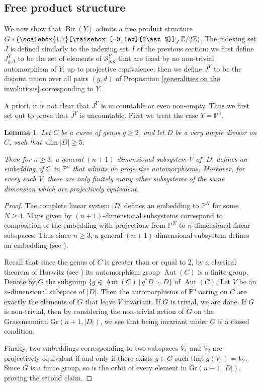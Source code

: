 \documentclass[JEP,XML,SOM,Unicode,published]{cedram}
\theoremstyle{plain}
\newtheorem{lemma}[theorem]{Lemma}
\theoremstyle{definition}
\newcommand\Aut{\operatorname{Aut}}
\newcommand\Bir{\operatorname{Bir}}
\newcommand{\ZZ}{\mathbb{Z}}
\newcommand{\PP}{\mathbb{P}}
\newcommand{\freeprod}{\mathop{\scalebox{1.7}{\raisebox{-0.1ex}{$\ast$}}}}
\begin{document}
\subsection{Free product structure}

We now show that $\Bir(Y)$ admits a free product structure $G \ast \left(\freeprod_J \ZZ/2\ZZ\right)$.
The indexing set $J$ is defined similarly to the indexing set~$I$ of the previous section: we first define $J_{g,d}^Y$ to be the set of elements of $\mathcal{S}_{g,d}^Y$ that are fixed by no non-trivial automorphism of $Y$, up to projective equivalence; then we define $J^Y$ to be the disjoint union over all pairs $(g,d)$ of Proposition \ref{generalities on the involutions} corresponding to $Y$.

A priori, it is not clear that $J^Y$ is uncountable or even non-empty. Thus we first set out to prove that $J^Y$ is uncountable. First we treat the case $Y = \PP^3$.

\begin{lemma}\label{non complete implies no autos}
Let $C$ be a curve of genus $g \geq 2$, and let $D$ be a very ample divisor on $C$, such that $\dim \lvert D \rvert \geq 5$.

Then for $n \geq 3$, a general $(n+1)$-dimensional subsystem $V$ of $\lvert D \rvert$ defines an embedding of $C$ in $\PP^n$ that admits no projective automorphisms. Moreover, for every such $V$, there are only finitely many other subsystems of the same dimension which are projectively equivalent.
\end{lemma}

\begin{proof}
The complete linear system $\lvert D \rvert$ defines an embedding to $\PP^N$ for some $N \geq 4$. Maps given by $(n+1)$-dimensional subsystems correspond to composition of the embedding with projections from $\PP^N$ to $n$-dimensional linear subspaces. Thus since $n \geq 3$, a general $(n+1)$-dimensional subsystem defines an embedding (see \cite[Props.\,3.4 and 3.5]{Hartshorne}).

Recall that since the genus of $C$ is greater than or equal to $2$, by a classical theorem of Hurwitz (see \cite{MR1510753}) its automorphism group $\Aut(C)$ is a finite group. Denote by $G$ the subgroup $\{g\in \Aut(C) \, | \, g^*D \sim D\}$ of $\Aut(C)$.
Let $V$ be an $n$-dimensional subspace of $\lvert D \rvert$. Then the automorphisms of $\PP^n$ acting on $C$ are exactly the elements of $G$ that leave $V$ invariant. If $G$ is trivial, we are done. If $G$ is non-trivial, then by considering the non-trivial action of $G$ on the Grassmannian $\mathrm{Gr}(n+1,\lvert D \rvert)$, we see that being invariant under $G$ is a closed condition.

Finally, two embeddings corresponding to two subspaces $V_1$ and $V_2$ are projectively equivalent if and only if there exists $g \in G$ such that $g(V_1) = V_2$. Since $G$ is a finite group, so is the orbit of every element in $\mathrm{Gr}(n+1,\lvert D \rvert)$, proving the second claim.
\end{proof}
\end{document}
